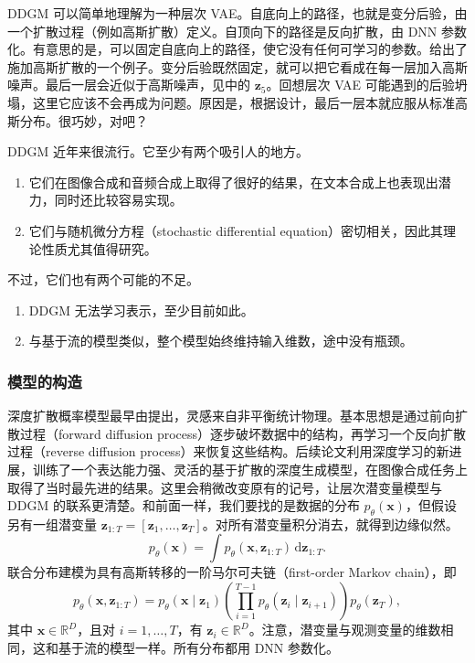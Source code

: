 DDGM 可以简单地理解为一种层次 VAE。自底向上的路径，也就是变分后验，由一个扩散过程（例如高斯扩散）定义。自顶向下的路径是反向扩散，由 DNN 参数化。有意思的是，可以固定自底向上的路径，使它没有任何可学习的参数。给出了施加高斯扩散的一个例子。变分后验既然固定，就可以把它看成在每一层加入高斯噪声。最后一层会近似于高斯噪声，见中的 $\mathbf{z}_5$。回想层次 VAE 可能遇到的后验坍塌，这里它应该不会再成为问题。原因是，根据设计，最后一层本就应服从标准高斯分布。很巧妙，对吧？

DDGM 近年来很流行。它至少有两个吸引人的地方。
\begin{enumerate}
\item 它们在图像合成和音频合成上取得了很好的结果，在文本合成上也表现出潜力，同时还比较容易实现。
\item 它们与随机微分方程（stochastic differential equation）密切相关，因此其理论性质尤其值得研究。
\end{enumerate}
不过，它们也有两个可能的不足。
\begin{enumerate}
\item DDGM 无法学习表示，至少目前如此。
\item 与基于流的模型类似，整个模型始终维持输入维数，途中没有瓶颈。
\end{enumerate}

\subsubsection{模型的构造}
深度扩散概率模型最早由提出，灵感来自非平衡统计物理。基本思想是通过前向扩散过程（forward diffusion process）逐步破坏数据中的结构，再学习一个反向扩散过程（reverse diffusion process）来恢复这些结构。后续论文利用深度学习的新进展，训练了一个表达能力强、灵活的基于扩散的深度生成模型，在图像合成任务上取得了当时最先进的结果。这里会稍微改变原有的记号，让层次潜变量模型与 DDGM 的联系更清楚。和前面一样，我们要找的是数据的分布 $p_\theta(\mathbf{x})$，但假设另有一组潜变量 $\mathbf{z}_{1:T}=[\mathbf{z}_1,\ldots,\mathbf{z}_T]$。对所有潜变量积分消去，就得到边缘似然。
\begin{equation}
p_\theta(\mathbf{x})=\int p_\theta(\mathbf{x},\mathbf{z}_{1:T})\,\mathrm{d}\mathbf{z}_{1:T}.
\tag{5.86}\label{eq:05-86}
\end{equation}
联合分布建模为具有高斯转移的一阶马尔可夫链（first-order Markov chain），即
\begin{equation}
p_\theta(\mathbf{x},\mathbf{z}_{1:T})=p_\theta(\mathbf{x}\mid\mathbf{z}_1)
 \left(\prod_{i=1}^{T-1}p_\theta(\mathbf{z}_i\mid\mathbf{z}_{i+1})\right)p_\theta(\mathbf{z}_T),
\tag{5.87}\label{eq:05-87}
\end{equation}
其中 $\mathbf{x}\in\mathbb{R}^D$，且对 $i=1,\ldots,T$，有 $\mathbf{z}_i\in\mathbb{R}^D$。注意，潜变量与观测变量的维数相同，这和基于流的模型一样。所有分布都用 DNN 参数化。

